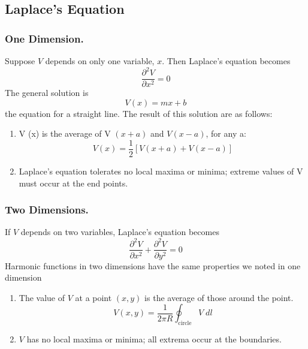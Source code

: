 \documentclass[../../../main.tex]{subfiles}
\begin{document}
\subsection*{Laplace's Equation}
\subsubsection*{One Dimension.} Suppose $V$ depends on only one variable, $x$. Then Laplace's equation becomes
\begin{equation*}
   \frac{\partial^2V}{\partial x^2}=0
\end{equation*}
The general solution is
\begin{equation*}
    V(x)=mx+b
\end{equation*}
the equation for a straight line. The result of this solution are as follows:
\begin{enumerate}
    \item V (x) is the average of V $(x + a)$ and $V (x - a)$, for any a:
    \begin{equation*}
        V (x) = \frac{1}{2} [V (x + a) + V (x - a)]
    \end{equation*}
    \item Laplace's equation tolerates no local maxima or minima; extreme values
    of V must occur at the end points. 
\end{enumerate}

\subsubsection*{Two Dimensions.} If $V$ depends on two variables, Laplace’s equation becomes
\begin{equation*}
    \frac{\partial^2V}{\partial x^2}+\frac{\partial^2V}{\partial y^2}=0
\end{equation*}
Harmonic functions in two dimensions have the same properties we noted in
one dimension
\begin{enumerate}
    \item The value of $V$ at a point $(x, y)$ is the average of those around the point.
    \begin{equation*}
        V(x,y)=\frac{1}{2\pi R}\oint_{\text{circle}}V\;dl
    \end{equation*}
    \item $V$ has no local maxima or minima; all extrema occur at the boundaries.
\end{enumerate} 
\end{document}
